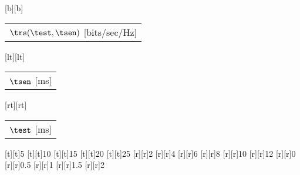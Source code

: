 %    
%
%
%
[b][b]{\fontsize{8}{12}\selectfont \color[rgb]{0,0,0}\setlength{\tabcolsep}{0pt}\begin{tabular}{c}$\trs(\test,\tsen)$ [bits/sec/Hz]\end{tabular}}%
[lt][lt]{\fontsize{8}{12}\selectfont \color[rgb]{0,0,0}\setlength{\tabcolsep}{0pt}\begin{tabular}{l}$\tsen$ [ms]\end{tabular}}%
[rt][rt]{\fontsize{8}{12}\selectfont \color[rgb]{0,0,0}\setlength{\tabcolsep}{0pt}\begin{tabular}{r}$\test$ [ms]\end{tabular}}%
%
\fontsize{8}{12}%
\selectfont%
%
[t][t]{5}%
[t][t]{10}%
[t][t]{15}%
[t][t]{20}%
[t][t]{25}%
%
[r][r]{2}%
[r][r]{4}%
[r][r]{6}%
[r][r]{8}%
[r][r]{10}%
[r][r]{12}%
%
[r][r]{0}%
[r][r]{0.5}%
[r][r]{1}%
[r][r]{1.5}%
[r][r]{2}%
%
%
